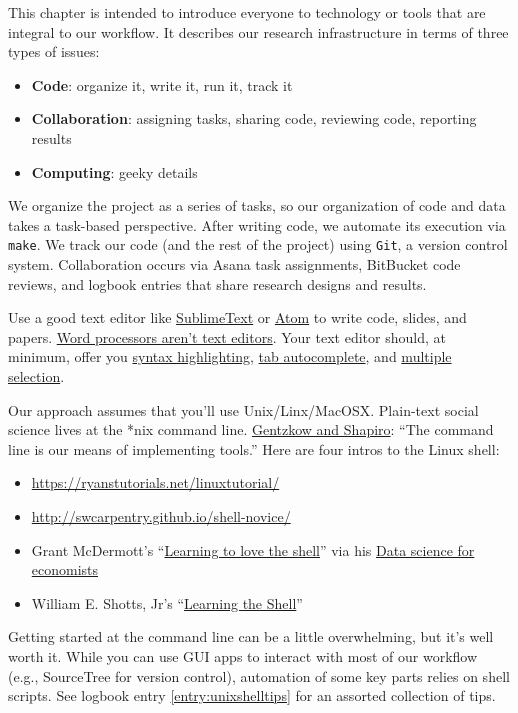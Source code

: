 This chapter is intended to introduce everyone to technology or tools that are integral to our workflow.
It describes our research infrastructure in terms of three types of issues:
\begin{itemize}
\item \textbf{Code}: organize it, write it, run it, track it
\item \textbf{Collaboration}: assigning tasks, sharing code, reviewing code, reporting results
\item \textbf{Computing}: geeky details
\end{itemize}

We organize the project as a series of tasks, so our organization of code and data takes a task-based perspective.
After writing code, we automate its execution via \texttt{make}.
We track our code (and the rest of the project) using \texttt{Git}, a version control system.
Collaboration occurs via Asana task assignments, BitBucket code reviews, and logbook entries that share research designs and results.

Use a good text editor like \href{https://www.sublimetext.com/}{SublimeText} or \href{https://atom.io/}{Atom} to write code, slides, and papers.
\href{http://plain-text.co/write-and-edit.html}{Word processors aren't text editors}.
Your text editor should, at minimum, offer you
\href{https://en.wikipedia.org/wiki/Syntax_highlighting}{syntax highlighting},
\href{https://en.wikipedia.org/wiki/Command-line_completion}{tab autocomplete},
and \href{https://www.sublimetext.com/}{multiple selection}.

Our approach assumes that you'll use Unix/Linx/MacOSX.
Plain-text social science lives at the *nix command line.
\href{https://github.com/gslab-econ/ra-manual/wiki/Getting-Started}{Gentzkow and Shapiro}: ``The command line is our means of implementing tools.''
Here are four intros to the Linux shell:
\begin{itemize}
	\item \url{https://ryanstutorials.net/linuxtutorial/}
	\item \url{http://swcarpentry.github.io/shell-novice/}
	\item Grant McDermott's ``\href{https://raw.githack.com/uo-ec607/lectures/master/03-shell/03-shell.html\#1}{Learning to love the shell}'' via his \href{https://github.com/uo-ec607/lectures}{Data science for economists}
	\item William E. Shotts, Jr's ``\href{http://linuxcommand.org/lc3_learning_the_shell.php}{Learning the Shell}''
\end{itemize}
Getting started at the command line can be a little overwhelming, but it's well worth it.
While you can use GUI apps to interact with most of our workflow (e.g., SourceTree for version control),
automation of some key parts relies on shell scripts.
See logbook entry \ref{entry:unixshelltips} for an assorted collection of tips.
